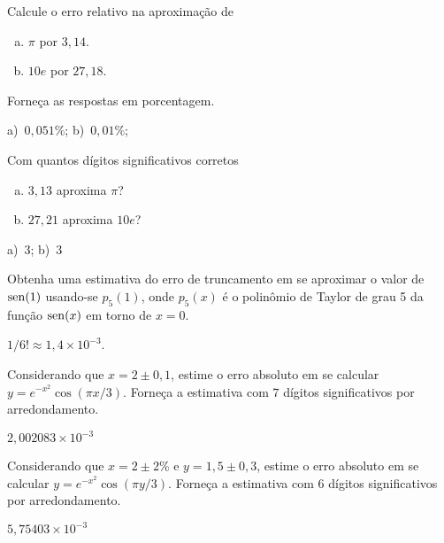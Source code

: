 \begin{exer}\label{exer:erro_rel}
  Calcule o erro relativo na aproximação de
  \begin{enumerate}[a)]
  \item $\pi$ por $3,14$.
  \item $10e$ por $27,18$.
  \end{enumerate}
  Forneça as respostas em porcentagem.
\end{exer}
\begin{resp}
  a)~$0,051\%$; b)~$0,01\%$;
\end{resp}

\begin{exer}\label{exer:dig_corr}
  Com quantos dígitos significativos corretos
  \begin{enumerate}[a)]
  \item $3,13$ aproxima $\pi$?
  \item $27,21$ aproxima $10e$?
  \end{enumerate}
\end{exer}
\begin{resp}
  a)~$3$; b)~$3$
\end{resp}


\begin{exer}
  Obtenha uma estimativa do erro de truncamento em se aproximar o valor de $\operatorname{sen}(1)$ usando-se $p_5(1)$, onde $p_5(x)$ é o polinômio de Taylor de grau 5 da função $\operatorname{sen}(x)$ em torno de $x=0$.
\end{exer}
\begin{resp}
  $1/6! \approx 1,4\times 10^{-3}$.
\end{resp}

\begin{exer}\label{exer:properro_abs1}
  Considerando que $x=2\pm 0,1$, estime o erro absoluto em se calcular $y = e^{-x^2}\cos(\pi x/3)$. Forneça a estimativa com $7$ dígitos significativos por arredondamento.
\end{exer}
\begin{resp}
  $2,002083\times 10^{-3}$
\end{resp}

\begin{exer}\label{exer:properro_abs2}
  Considerando que $x=2\pm 2\%$ e $y=1,5\pm 0,3$, estime o erro absoluto em se calcular $y = e^{-x^2}\cos(\pi y/3)$. Forneça a estimativa com $6$ dígitos significativos por arredondamento.
\end{exer}
\begin{resp}
  $5,75403\times 10^{-3}$
\end{resp}

